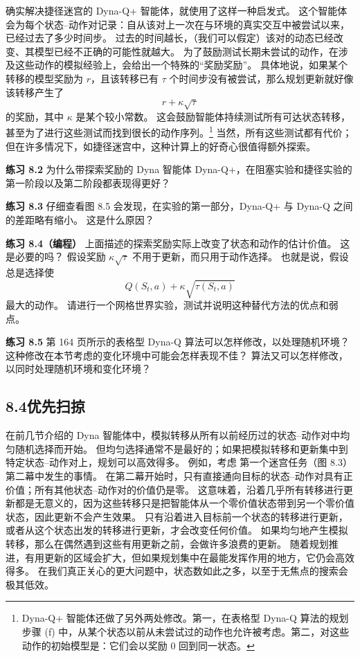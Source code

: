 \documentclass[UTF8, 12pt, fontset=fandol, oneside]{ctexart}
\begin{document}
确实解决捷径迷宫的 Dyna-Q+ 智能体，就使用了这样一种启发式。
这个智能体会为每个状态--动作对记录：自从该对上一次在与环境的真实交互中被尝试以来，已经过去了多少时间步。
过去的时间越长，（我们可以假定）该对的动态已经改变、其模型已经不正确的可能性就越大。
为了鼓励测试长期未尝试的动作，在涉及这些动作的模拟经验上，会给出一个特殊的“奖励奖励”。
具体地说，如果某个转移的模型奖励为 $r$，且该转移已有 $\tau$ 个时间步没有被尝试，那么规划更新就好像该转移产生了
\[
r+\kappa\sqrt{\tau}
\]
的奖励，其中 $\kappa$ 是某个较小常数。
这会鼓励智能体持续测试所有可达状态转移，甚至为了进行这些测试而找到很长的动作序列。\footnote{Dyna-Q+ 智能体还做了另外两处修改。第一，在表格型 Dyna-Q 算法的规划步骤 (f) 中，从某个状态以前从未尝试过的动作也允许被考虑。第二，对这些动作的初始模型是：它们会以奖励 0 回到同一状态。}
当然，所有这些测试都有代价；但在许多情况下，如捷径迷宫中，这种计算上的好奇心很值得额外探索。

\noindent\textbf{练习 8.2}
为什么带探索奖励的 Dyna 智能体 Dyna-Q+，在阻塞实验和捷径实验的第一阶段以及第二阶段都表现得更好？

\noindent\textbf{练习 8.3}
仔细查看图 8.5 会发现，在实验的第一部分，Dyna-Q+ 与 Dyna-Q 之间的差距略有缩小。
这是什么原因？

\noindent\textbf{练习 8.4（编程）}
上面描述的探索奖励实际上改变了状态和动作的估计价值。
这是必要的吗？
假设奖励 $\kappa\sqrt{\tau}$ 不用于更新，而只用于动作选择。
也就是说，假设总是选择使
\[
Q(S_t,a)+\kappa\sqrt{\tau(S_t,a)}
\]
最大的动作。
请进行一个网格世界实验，测试并说明这种替代方法的优点和弱点。

\noindent\textbf{练习 8.5}
第 164 页所示的表格型 Dyna-Q 算法可以怎样修改，以处理随机环境？
这种修改在本节考虑的变化环境中可能会怎样表现不佳？
算法又可以怎样修改，以同时处理随机环境和变化环境？

\subsection*{8.4\quad 优先扫掠}

在前几节介绍的 Dyna 智能体中，模拟转移从所有以前经历过的状态--动作对中均匀随机选择而开始。
但均匀选择通常不是最好的；如果把模拟转移和更新集中到特定状态--动作对上，规划可以高效得多。
例如，考虑
第一个迷宫任务（图 8.3）第二幕中发生的事情。
在第二幕开始时，只有直接通向目标的状态--动作对具有正价值；所有其他状态--动作对的价值仍是零。
这意味着，沿着几乎所有转移进行更新都是无意义的，因为这些转移只是把智能体从一个零价值状态带到另一个零价值状态，因此更新不会产生效果。
只有沿着进入目标前一个状态的转移进行更新，或者从这个状态出发的转移进行更新，才会改变任何价值。
如果均匀地产生模拟转移，那么在偶然遇到这些有用更新之前，会做许多浪费的更新。
随着规划推进，有用更新的区域会扩大，但如果规划集中在最能发挥作用的地方，它仍会高效得多。
在我们真正关心的更大问题中，状态数如此之多，以至于无焦点的搜索会极其低效。
\end{document}
